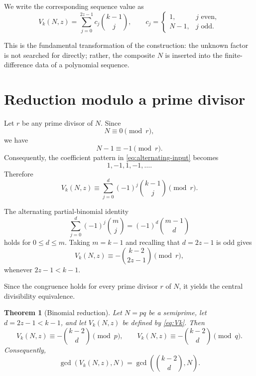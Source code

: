 \documentclass[11pt,a4paper]{article}
\newtheorem{theorem}{Theorem}[section]
\newcommand{\Arith}{\mathrm{ArithSeg}}
\begin{document}
We write the corresponding sequence value as
\begin{equation}
V_k(N,z)
=
\sum_{j=0}^{2z-1} c_j\binom{k-1}{j},
\qquad
c_j=
\begin{cases}
1,&j\text{ even},\\
N-1,&j\text{ odd}.
\end{cases}
\label{eq:Vk}
\end{equation}

This is the fundamental transformation of the \Arith{} construction: the unknown factor is not searched for directly; rather, the composite $N$ is inserted into the finite-difference data of a polynomial sequence.

\section{Reduction modulo a prime divisor}
\label{sec:modprime}

Let $r$ be any prime divisor of $N$. Since
\[
N\equiv0\pmod r,
\]
we have
\[
N-1\equiv-1\pmod r.
\]
Consequently, the coefficient pattern in \eqref{eq:alternating-input} becomes
\[
1,-1,1,-1,\ldots.
\]
Therefore
\begin{equation}
V_k(N,z)
\equiv
\sum_{j=0}^{d}(-1)^j\binom{k-1}{j}
\pmod r.
\label{eq:alt-sum}
\end{equation}

The alternating partial-binomial identity
\begin{equation}
\boxed{
\sum_{j=0}^{d}(-1)^j\binom{m}{j}
=(-1)^d\binom{m-1}{d}
}
\label{eq:alternating-binomial}
\end{equation}
holds for $0\le d\le m$. Taking $m=k-1$ and recalling that $d=2z-1$ is odd gives
\begin{equation}
\boxed{
V_k(N,z)
\equiv
-\binom{k-2}{2z-1}
\pmod r,
}
\label{eq:prime-reduction}
\end{equation}
whenever $2z-1<k-1$.

Since the congruence holds for every prime divisor $r$ of $N$, it yields the central divisibility equivalence.

\begin{theorem}[Binomial reduction]
Let $N=pq$ be a semiprime, let $d=2z-1<k-1$, and let $V_k(N,z)$ be defined by \eqref{eq:Vk}. Then
\begin{equation}
\boxed{
V_k(N,z)\equiv-\binom{k-2}{d}\pmod p,
\qquad
V_k(N,z)\equiv-\binom{k-2}{d}\pmod q.
}
\end{equation}
Consequently,
\begin{equation}
\boxed{
\gcd(V_k(N,z),N)
=
\gcd\!\left(\binom{k-2}{d},N\right).
}
\label{eq:gcd-binomial}
\end{equation}
\end{theorem}
\end{document}
